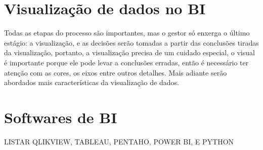 \section{Visualização de dados no BI}

Todas as etapas do processo são importantes, mas o gestor só enxerga o último estágio: a visualização, e as decisões serão tomadas a partir das conclusões tiradas da visualização, portanto, a visualização precisa de um cuidado especial, o visual é importante porque ele pode levar a conclusões erradas, então é necessário ter atenção com as cores, os eixos entre outros detalhes. Mais adiante serão abordados mais características da visualização de dados.

\section{Softwares de BI}

LISTAR QLIKVIEW, TABLEAU, PENTAHO, POWER BI, E PYTHON